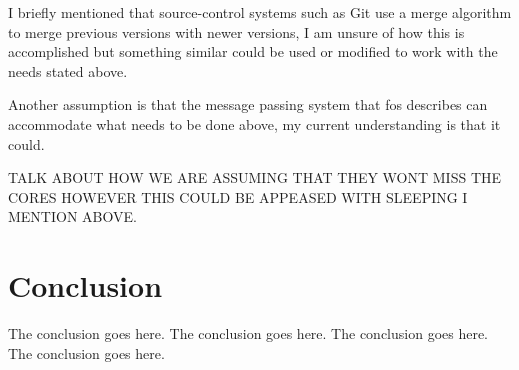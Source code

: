 \documentclass[journal]{IEEEtran}
\begin{document}
I briefly mentioned that source-control systems such as Git use a merge algorithm to merge previous versions with newer versions, I am unsure of how this is accomplished but something similar could be used or modified to work with the needs stated above.

Another assumption is that the message passing system that fos describes can accommodate what needs to be done above, my current understanding is that it could. 

TALK ABOUT HOW WE ARE ASSUMING THAT THEY WONT MISS THE CORES HOWEVER THIS COULD BE APPEASED WITH SLEEPING I MENTION ABOVE.

\section{Conclusion}
The conclusion goes here.
The conclusion goes here.
The conclusion goes here.
The conclusion goes here.




\end{document}

